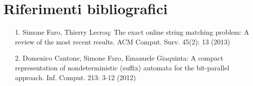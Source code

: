 \chapter*{Riferimenti bibliografici}

\begin{itemize}

  \item[1.] Simone Faro, Thierry Lecroq: The exact online string matching problem: A review of the most recent results. ACM Comput. Surv. 45(2): 13 (2013)
  
  \item[2.] Domenico Cantone, Simone Faro, Emanuele Giaquinta: A compact representation of nondeterministic (suffix) automata for the bit-parallel approach. Inf. Comput. 213: 3-12 (2012)   
  
\end{itemize}